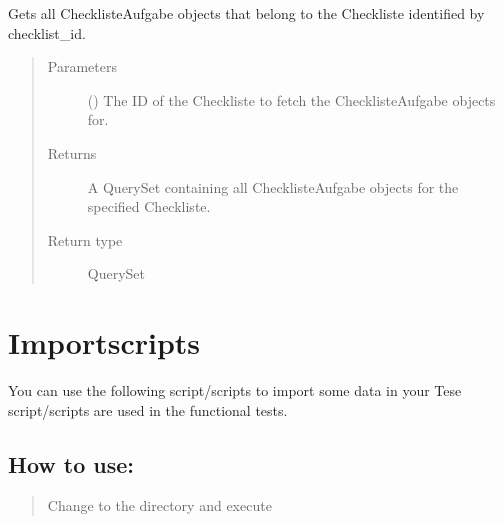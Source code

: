 \documentclass[letterpaper,10pt,english]{sphinxmanual}
\begin{document}
\begin{fulllineitems}
\label{\detokenize{masterCodeDoc:checklisten.templatetags.t_checklisten.get_tasks.get_tasks}}
Gets all ChecklisteAufgabe objects that belong to the Checkliste identified by checklist\_id.
\begin{quote}\begin{description}
\item[{Parameters}] \leavevmode
{} () \textendash{} The ID of the Checkliste to fetch the ChecklisteAufgabe objects for.

\item[{Returns}] \leavevmode
A QuerySet containing all ChecklisteAufgabe objects for the specified Checkliste.

\item[{Return type}] \leavevmode
QuerySet

\end{description}\end{quote}

\end{fulllineitems}



\section{Importscripts}
\label{\detokenize{masterCodeDoc:importscripts}}
You can use the following script/scripts to import some data in your 
Tese script/scripts are used in the functional tests.


\subsection{How to use:}
\label{\detokenize{masterCodeDoc:how-to-use}}\begin{quote}

Change to the directory  and execute  
\end{quote}
\end{document}
